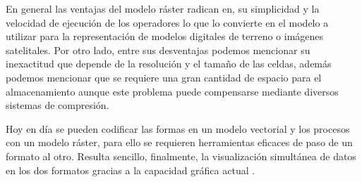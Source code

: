 En general las ventajas del modelo ráster radican en, su simplicidad y la velocidad de ejecución de
los operadores lo que lo convierte en el modelo a utilizar para la representación de modelos
digitales de terreno o imágenes satelitales. Por otro lado, entre sus desventajas podemos
mencionar su inexactitud que depende de la resolución y el tamaño de las celdas, además podemos
mencionar que se requiere una gran cantidad de espacio para el almacenamiento aunque este problema
puede compensarse mediante diversos sistemas de compresión.

Hoy en día se pueden codificar las formas en un modelo vectorial y los procesos con un modelo
ráster, para ello se requieren herramientas eficaces de paso de un formato al otro. Resulta
sencillo, finalmente, la visualización simultánea de datos en los dos formatos gracias a la
capacidad gráfica actual \citet{fAlonsoSig2006}.
